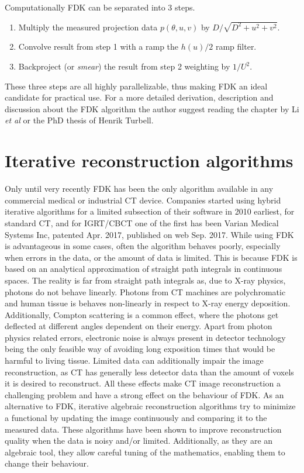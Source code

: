 Computationally FDK can be separated into 3 steps. 

\begin{enumerate}
\item Multiply the measured projection data $p(\theta,u,v)$ by $D/\sqrt{D^2+u^2+v^2}$.
\item Convolve result from step 1 with a ramp the $h(u)/2$ ramp filter. 
\item Backproject (or \textit{smear}) the result from step 2 weighting by $1/U^2$.
\end{enumerate}

These three steps are all highly parallelizable, thus making FDK an ideal candidate for practical use. For a more detailed derivation, description and discussion about the FDK algorithm the author suggest reading the chapter by Li \textit{et al}\cite{CBCTbook} or the PhD thesis of Henrik Turbell\cite{turbell2001cone}. 


\section{Iterative reconstruction algorithms}
Only until very recently FDK has been the only algorithm available in any commercial medical or industrial CT device. Companies started using hybrid iterative algorithms for a limited subsection of their software in 2010 earliest\cite{geyer2015state}, for standard CT, and for IGRT/CBCT one of the first has been Varian Medical Systems Inc, patented Apr. 2017\cite{paysan2017iterative}, published on web Sep. 2017\cite{Varian}.  While using FDK is advantageous in some cases, often the algorithm behaves poorly, especially when errors in the data, or the amount of data is limited. This is because FDK is based on an analytical approximation of straight path integrals in continuous spaces. The reality is far from straight path integrals as, due to X-ray physics, photons do not behave linearly. Photons from CT machines are polychromatic and human tissue is behaves non-linearly in respect to X-ray energy deposition. Additionally, Compton scattering is a common effect, where the photons get deflected at different angles dependent on their energy. Apart from photon physics related errors, electronic noise is always present in detector technology being the only feasible way of avoiding  long exposition times that would be harmful to living tissue. Limited data can additionally impair the image reconstruction, as CT has generally less detector data than the amount of voxels it is desired to reconstruct. All these effects make CT image reconstruction a challenging problem and have a strong effect on the behaviour of FDK. As an alternative to FDK, iterative algebraic reconstruction algorithms try to minimize a functional by updating the image continuously and comparing it to the measured data. These algorithms have been shown to improve reconstruction quality when the data is noisy and/or limited. Additionally, as they are an algebraic tool, they allow careful tuning of the mathematics, enabling them to change their behaviour.

